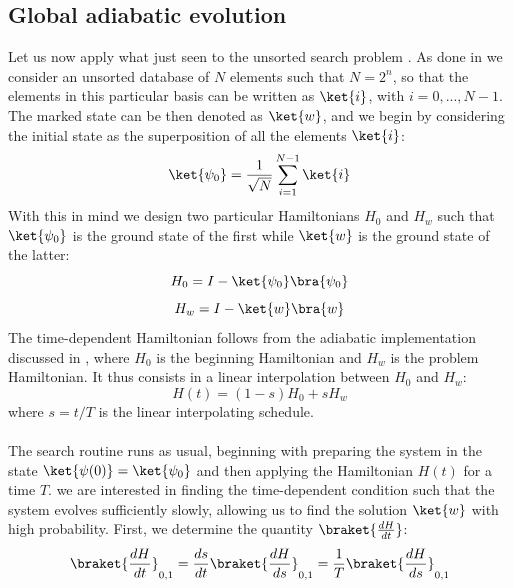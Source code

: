     \subsection{Global adiabatic evolution}\label{subsec:global adiabatic}
    Let us now apply what just seen to the unsorted search problem \cite{Roland2002}. As done in  we consider an unsorted database of $N$ elements such that $N=2^n$, so that the elements in this particular basis can be written as $\ket{i}$, with $i=0,...,N-1$. The marked state can be then denoted as $\ket{w}$, and we begin by considering the initial state as the superposition of all the elements $\ket{i}$:
    \begin{equation}
      \ket{\psi_0}=\frac{1}{\sqrt{N}}\sum_{i=1}^{N-1}\ket{i}
    \end{equation}
    With this in mind we design two particular Hamiltonians $H_0$ and $H_w$ such that $\ket{\psi_0}$ is the ground state of the first while $\ket{w}$ is the ground state of the latter:
    \begin{equation}
      H_0 = I- \ket{\psi_0}\bra{\psi_0}
      \label{eq:adiabatic_ground}
    \end{equation}
    \vspace{-1cm}
    \begin{equation}
      H_w = I- \ket{w}\bra{w}
      \label{eq:adiabatic_first}
    \end{equation}
    The time-dependent Hamiltonian follows from the adiabatic implementation discussed in , where $H_0$ is the beginning Hamiltonian and $H_w$ is the problem Hamiltonian. It thus consists in a linear interpolation between $H_0$ and $H_w$:
    \begin{equation}
      H(t) = (1-s)H_0 + sH_w
    \end{equation}
    where $s=t/T$ is the linear interpolating schedule.\\ \\
    The search routine runs as usual, beginning with preparing the system in the state $\ket{\psi(0)}=\ket{\psi_0}$ and then applying the Hamiltonian $H(t)$ for a time $T$. we are interested in finding the time-dependent condition such that the system evolves sufficiently slowly, allowing us to find the solution $\ket{w}$ with high probability. First, we determine the quantity $\braket{\frac{dH}{dt}}$:
    \begin{equation}
      \braket{\frac{dH}{dt}}_{0,1} = \frac{ds}{dt}\braket{\frac{dH}{ds}}_{0,1} = \frac{1}{T}\braket{\frac{dH}{ds}}_{0,1}
    \end{equation}
